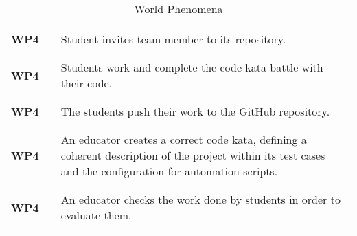 \begin{table}[H]
\begin{longtable}{l l p{12cm}}
                     &        &                                                                                                                                                             \\\hline & & \\
        \textbf{WP4} & \vline & Student invites team member to its repository.                                                                                                              \\
                     &        &                                                                                                                                                             \\\hline & & \\
        \textbf{WP4} & \vline & Students work and complete the code kata battle with their code.                                                                                            \\
                     &        &                                                                                                                                                             \\\hline & & \\
        \textbf{WP4} & \vline & The students push their work to the GitHub repository.                                                                                                      \\
                     &        &                                                                                                                                                             \\\hline & & \\
        \textbf{WP4} & \vline & An educator creates a correct code kata, defining a coherent description of the project within its test cases and the configuration for automation scripts. \\
                     &        &                                                                                                                                                             \\\hline & & \\
        \textbf{WP4} & \vline & An educator checks the work done by students in order to evaluate them.                                                                                     \\
                     &        &                                                                                                                                                             \\
        \hline
    \end{longtable}
    \caption{World Phenomena}
\end{table}

